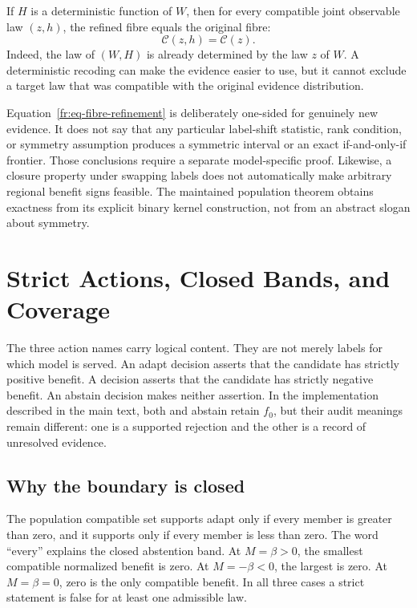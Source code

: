 If $H$ is a deterministic function of $W$, then for every compatible joint observable law
$(z,h)$, the refined fibre equals the original fibre:
\begin{equation}
  \mathcal C(z,h)=\mathcal C(z).
  \label{fr:eq-deterministic-refinement}
\end{equation}
Indeed, the law of $(W,H)$ is already determined by the law $z$ of $W$.  A deterministic recoding
can make the evidence easier to use, but it cannot exclude a target law that was compatible with
the original evidence distribution.

Equation~\eqref{fr:eq-fibre-refinement} is deliberately one-sided for genuinely new evidence.  It does not say that any
particular label-shift statistic, rank condition, or symmetry assumption produces a symmetric
interval or an exact if-and-only-if frontier.  Those conclusions require a separate model-specific
proof.  Likewise, a closure property under swapping labels does not automatically make arbitrary
regional benefit signs feasible.  The maintained population theorem obtains exactness from its
explicit binary kernel construction, not from an abstract slogan about symmetry.

\section{Strict Actions, Closed Bands, and Coverage}
\label{fr:sec-action-semantics}

The three action names carry logical content.  They are not merely labels for which model is served.
An adapt decision asserts that the candidate has strictly positive benefit.  A \freeze decision
asserts that the candidate has strictly negative benefit.  An abstain decision makes neither
assertion.  In the implementation described in the main text, both \freeze and abstain retain
$f_0$, but their audit meanings remain different: one is a supported rejection and the other is a
record of unresolved evidence.

\subsection{Why the boundary is closed}
\label{fr:subsec-closed-band}

The population compatible set supports adapt only if every member is greater than zero, and it
supports \freeze only if every member is less than zero.  The word ``every'' explains the closed
abstention band.  At $M=\beta>0$, the smallest compatible normalized benefit is zero.  At
$M=-\beta<0$, the largest is zero.  At $M=\beta=0$, zero is the only compatible benefit.  In all
three cases a strict statement is false for at least one admissible law.

